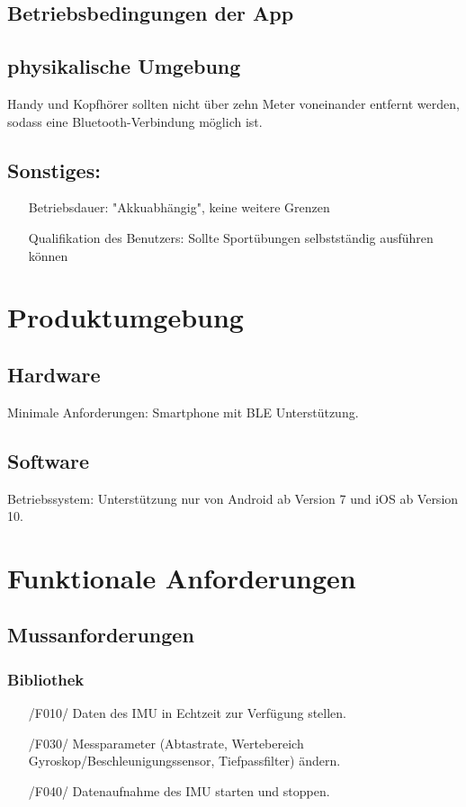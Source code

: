 \documentclass[a4paper,12pt]{article}
\begin{document}
  \subsection{Betriebsbedingungen der App}
    \subsection{physikalische Umgebung}
      Handy und Kopfhörer sollten nicht über zehn Meter voneinander entfernt werden, sodass eine Bluetooth-Verbindung möglich ist.
    \subsection{Sonstiges:}
    \begin{itemize}
      \item[] Betriebsdauer: "Akkuabhängig", keine weitere Grenzen 
      \item[] Qualifikation des Benutzers: Sollte Sportübungen selbstständig ausführen können
    \end{itemize}
      
\section{Produktumgebung}
\subsection{Hardware} \textsf{Minimale Anforderungen:} Smartphone mit \Gls{BLE} Unterstützung.
\subsection{Software} \textsf{Betriebssystem:} Unterstützung nur von Android ab Version 7 und iOS ab Version 10.

\section{Funktionale Anforderungen}
  \subsection{Mussanforderungen}
    \subsubsection{Bibliothek}
    \begin{itemize}
      \item[/F010/] Daten des \Gls{IMU} in \Gls{Echtzeit} zur Verfügung stellen.
      \item[/F030/] Messparameter (Abtastrate, Wertebereich Gyroskop/Beschleunigungssensor, Tiefpassfilter) ändern. 
      \item[/F040/] Datenaufnahme des \Gls{IMU} starten und stoppen.
    \end{itemize}
\end{document}
